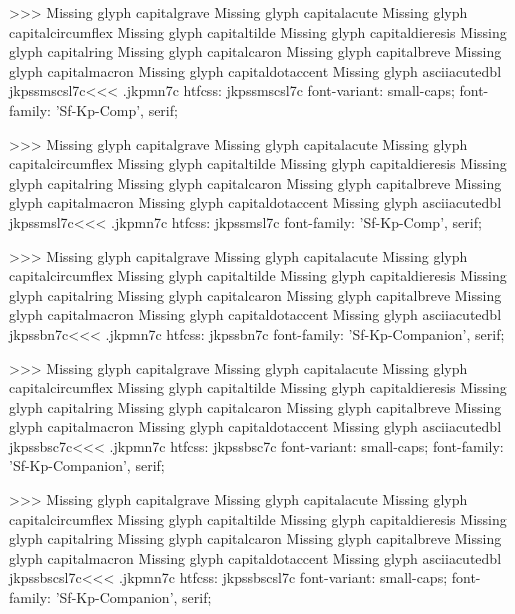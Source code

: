 >>>
Missing glyph	capitalgrave
Missing glyph	capitalacute
Missing glyph	capitalcircumflex
Missing glyph	capitaltilde
Missing glyph	capitaldieresis
Missing glyph	capitalring
Missing glyph	capitalcaron
Missing glyph	capitalbreve
Missing glyph	capitalmacron
Missing glyph	capitaldotaccent
Missing glyph	asciiacutedbl
\<jkpssmscsl7c\><<<
.jkpmn7c
htfcss:  jkpssmscsl7c  font-variant: small-caps; font-family: 'Sf-Kp-Comp', serif;

>>>
Missing glyph	capitalgrave
Missing glyph	capitalacute
Missing glyph	capitalcircumflex
Missing glyph	capitaltilde
Missing glyph	capitaldieresis
Missing glyph	capitalring
Missing glyph	capitalcaron
Missing glyph	capitalbreve
Missing glyph	capitalmacron
Missing glyph	capitaldotaccent
Missing glyph	asciiacutedbl
\<jkpssmsl7c\><<<
.jkpmn7c
htfcss:  jkpssmsl7c  font-family: 'Sf-Kp-Comp', serif;

>>>
Missing glyph	capitalgrave
Missing glyph	capitalacute
Missing glyph	capitalcircumflex
Missing glyph	capitaltilde
Missing glyph	capitaldieresis
Missing glyph	capitalring
Missing glyph	capitalcaron
Missing glyph	capitalbreve
Missing glyph	capitalmacron
Missing glyph	capitaldotaccent
Missing glyph	asciiacutedbl
\<jkpssbn7c\><<<
.jkpmn7c
htfcss:  jkpssbn7c  font-family: 'Sf-Kp-Companion', serif;

>>>
Missing glyph	capitalgrave
Missing glyph	capitalacute
Missing glyph	capitalcircumflex
Missing glyph	capitaltilde
Missing glyph	capitaldieresis
Missing glyph	capitalring
Missing glyph	capitalcaron
Missing glyph	capitalbreve
Missing glyph	capitalmacron
Missing glyph	capitaldotaccent
Missing glyph	asciiacutedbl
\<jkpssbsc7c\><<<
.jkpmn7c
htfcss:  jkpssbsc7c  font-variant: small-caps; font-family: 'Sf-Kp-Companion', serif;

>>>
Missing glyph	capitalgrave
Missing glyph	capitalacute
Missing glyph	capitalcircumflex
Missing glyph	capitaltilde
Missing glyph	capitaldieresis
Missing glyph	capitalring
Missing glyph	capitalcaron
Missing glyph	capitalbreve
Missing glyph	capitalmacron
Missing glyph	capitaldotaccent
Missing glyph	asciiacutedbl
\<jkpssbscsl7c\><<<
.jkpmn7c
htfcss:  jkpssbscsl7c  font-variant: small-caps; font-family: 'Sf-Kp-Companion', serif;

